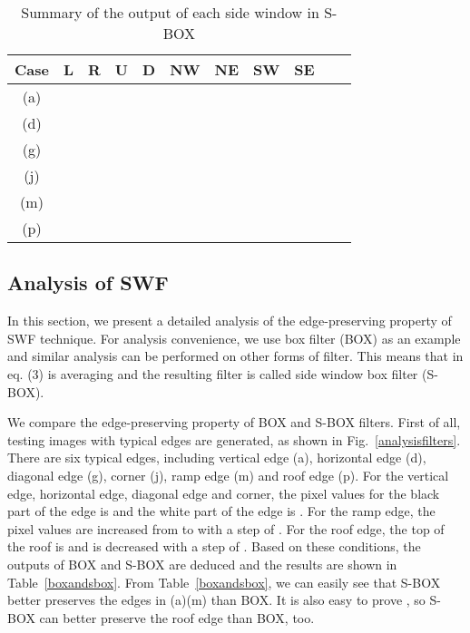 \documentclass[10pt,twocolumn,letterpaper]{article}
\begin{document}
\begin{table*}
	{	\small
		\centering
		\caption{Summary of the output of each side window in S-BOX}
		\begin{tabular}{|c|c|c|c|c|c|c|c|c|c|c|}
			\hline
			Case&L&R&U&D&NW&NE&SW&SE\\
			\hline
			(a)&&&&&&&&\\
			\hline
			(d)&&&&&&&&\\
			\hline
			(g)&&&&&&&&\\
			\hline
			(j)&&&&&&&&\\
			\hline
			(m)&&&&&&&&\\
			\hline
			(p)&&&&&{\tiny }&&&\\
			\hline
		\end{tabular}
		\label{outputsofsidewindow}
	}
\end{table*}

\subsection{Analysis of SWF}
In this section, we present a detailed analysis of the edge-preserving property of SWF technique. For analysis convenience, we use box filter (BOX) as an example and similar analysis can be performed on other forms of filter. This means that  in eq. (3) is averaging and the resulting filter is called side window box filter (S-BOX).  

We compare the edge-preserving property of BOX and S-BOX filters. First of all, testing images with typical edges are generated, as shown in Fig.~\ref{analysisfilters}. There are six typical edges, including vertical edge (a), horizontal edge (d), diagonal edge (g), corner (j), ramp edge (m) and roof edge (p). For the vertical edge, horizontal edge, diagonal edge and corner, the pixel values for the black part of the edge is  and the white part of the edge is . For the ramp edge, the pixel values are increased from  to  with a step of . For the roof edge, the top of the roof is  and is decreased with a step of . Based on these conditions, the outputs of BOX and S-BOX are deduced and the results are shown in Table~\ref{boxandsbox}. From Table~\ref{boxandsbox}, we can easily see that S-BOX better preserves the edges in (a)(m) than BOX. It is also easy to prove , so S-BOX can better preserve the roof edge than BOX, too. 
\end{document}
